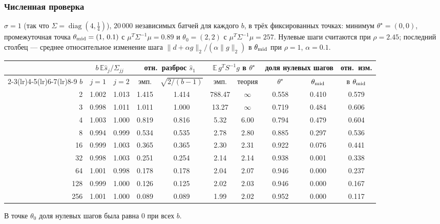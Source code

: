 \documentclass[11pt,a4paper]{article}
\newcommand{\norm}[1]{\lVert #1\rVert_2}
\newcommand{\E}{\mathbb{E}}
\DeclareMathOperator{\diag}{diag}
\begin{document}
\subsubsection*{Численная проверка}

$\sigma=1$ (так что $\Sigma=\diag(4,\tfrac14)$), $20\,000$ независимых батчей для
каждого $b$, в трёх фиксированных точках: минимум $\theta^\star=(0,0)$, промежуточная
точка $\theta_{\rm mid}=(1,\,0.1)$ с $\mu^T\Sigma^{-1}\mu=0.89$ и $\theta_0=(2,2)$ с
$\mu^T\Sigma^{-1}\mu=257$. Нулевые шаги считаются при $\rho=2.45$; последний столбец —
среднее относительное изменение шага $\norm{d+\alpha g}/(\alpha\norm g)$ в
$\theta_{\rm mid}$ при $\rho=1$, $\alpha=0.1$.

\begin{center}
\small
\setlength{\tabcolsep}{4.0pt}
\begin{tabular}{@{}rccccccccc@{}}
\toprule
& \multicolumn{2}{c}{$b\,\E\widehat s_j/\Sigma_{jj}$} & \multicolumn{2}{c}{отн.\ разброс $\widehat s_1$}
& \multicolumn{2}{c}{$\E\,g^TS^{-1}g$ в $\theta^\star$} & \multicolumn{2}{c}{доля нулевых шагов} & отн.\ изм. \\
\cmidrule(lr){2-3}\cmidrule(lr){4-5}\cmidrule(lr){6-7}\cmidrule(lr){8-9}
$b$ & $j=1$ & $j=2$ & эмп. & $\sqrt{2/(b-1)}$ & эмп. & теория & $\theta^\star$ & $\theta_{\rm mid}$ & в $\theta_{\rm mid}$ \\
\midrule
2 & 1.002 & 1.013 & 1.415 & 1.414 & 788.47 & $\infty$ & 0.558 & 0.410 & 0.579 \\
3 & 0.998 & 1.011 & 1.011 & 1.000 & 13.27 & $\infty$ & 0.719 & 0.484 & 0.606 \\
4 & 1.003 & 1.000 & 0.819 & 0.816 & 5.32 & 6.00 & 0.794 & 0.479 & 0.604 \\
8 & 0.994 & 0.999 & 0.534 & 0.535 & 2.78 & 2.80 & 0.885 & 0.297 & 0.536 \\
16 & 0.999 & 1.003 & 0.365 & 0.365 & 2.30 & 2.31 & 0.922 & 0.076 & 0.441 \\
32 & 0.998 & 1.003 & 0.251 & 0.254 & 2.14 & 2.14 & 0.938 & 0.001 & 0.338 \\
64 & 1.001 & 0.998 & 0.178 & 0.178 & 2.04 & 2.07 & 0.946 & 0.000 & 0.237 \\
128 & 0.999 & 1.000 & 0.126 & 0.125 & 2.02 & 2.03 & 0.946 & 0.000 & 0.167 \\
256 & 1.001 & 1.000 & 0.089 & 0.089 & 1.99 & 2.02 & 0.952 & 0.000 & 0.117 \\
\bottomrule
\end{tabular}
\end{center}
В точке $\theta_0$ доля нулевых шагов была равна $0$ при всех $b$.
\end{document}
